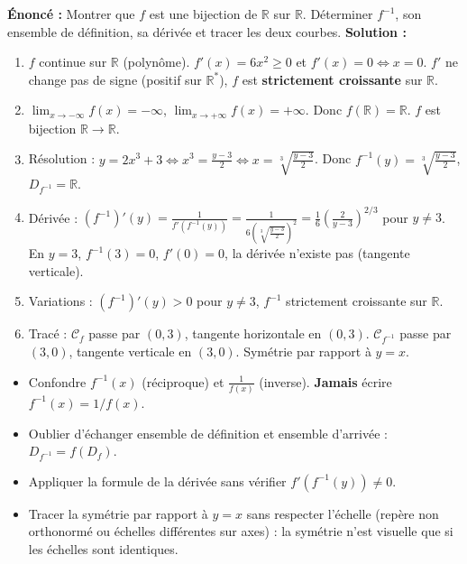 \documentclass[11pt]{article}
\begin{document}
\begin{exoresolu}[Réciproque de $f(x) = 2x^3 + 3$ sur $\mathbb{R}$]
\textbf{Énoncé :} Montrer que $f$ est une bijection de $\mathbb{R}$ sur $\mathbb{R}$. Déterminer $f^{-1}$, son ensemble de définition, sa dérivée et tracer les deux courbes.
\tcblower
\textbf{Solution :}
\begin{enumerate}
  \item $f$ continue sur $\mathbb{R}$ (polynôme). $f'(x) = 6x^2 \ge 0$ et $f'(x)=0 \iff x=0$. $f'$ ne change pas de signe (positif sur $\mathbb{R}^*$), $f$ est \textbf{strictement croissante} sur $\mathbb{R}$.
  \item $\lim_{x\to-\infty} f(x) = -\infty$, $\lim_{x\to+\infty} f(x) = +\infty$. Donc $f(\mathbb{R}) = \mathbb{R}$. $f$ est bijection $\mathbb{R} \to \mathbb{R}$.
  \item Résolution : $y = 2x^3 + 3 \iff x^3 = \frac{y-3}{2} \iff x = \sqrt[3]{\frac{y-3}{2}}$. Donc $f^{-1}(y) = \sqrt[3]{\frac{y-3}{2}}$, $D_{f^{-1}} = \mathbb{R}$.
  \item Dérivée : $(f^{-1})'(y) = \frac{1}{f'(f^{-1}(y))} = \frac{1}{6\left(\sqrt[3]{\frac{y-3}{2}}\right)^2} = \frac{1}{6} \left(\frac{2}{y-3}\right)^{2/3}$ pour $y \neq 3$. En $y=3$, $f^{-1}(3)=0$, $f'(0)=0$, la dérivée n'existe pas (tangente verticale).
  \item Variations : $(f^{-1})'(y) > 0$ pour $y \neq 3$, $f^{-1}$ strictement croissante sur $\mathbb{R}$.
  \item Tracé : $\mathcal{C}_f$ passe par $(0,3)$, tangente horizontale en $(0,3)$. $\mathcal{C}_{f^{-1}}$ passe par $(3,0)$, tangente verticale en $(3,0)$. Symétrie par rapport à $y=x$.
\end{enumerate}
\end{exoresolu}

\begin{attention}
\begin{itemize}
  \item Confondre $f^{-1}(x)$ (réciproque) et $\frac{1}{f(x)}$ (inverse). \textbf{Jamais} écrire $f^{-1}(x) = 1/f(x)$.
  \item Oublier d'échanger ensemble de définition et ensemble d'arrivée : $D_{f^{-1}} = f(D_f)$.
  \item Appliquer la formule de la dérivée sans vérifier $f'(f^{-1}(y)) \neq 0$.
  \item Tracer la symétrie par rapport à $y=x$ sans respecter l'échelle (repère non orthonormé ou échelles différentes sur axes) : la symétrie n'est visuelle que si les échelles sont identiques.
\end{itemize}
\end{attention}
\end{document}
